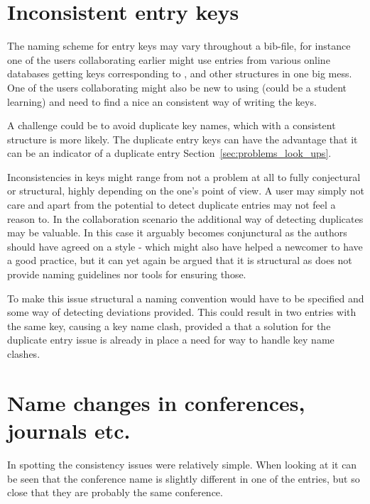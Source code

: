 \section{Inconsistent entry keys}
\label{sec:problems_inconsistent_keys}

The naming scheme for entry keys may vary throughout a bib-file, for
instance one of the users collaborating earlier might use entries from
various online databases getting keys corresponding to
,  and
other structures in one big mess.  One of the users collaborating
might also be new to using {\bibtex} (could be a student learning) and
need to find a nice an consistent way of writing the keys.

A challenge could be to avoid duplicate key names, which with a
consistent structure is more likely.  The duplicate entry keys can
have the advantage that it can be an indicator of a duplicate entry
Section~\ref{sec:problems_look_ups}.

Inconsistencies in keys might range from not a problem at all to fully
conjectural or structural, highly depending on the one's point of
view.  A user may simply not care and apart from the potential to
detect duplicate entries may not feel a reason to.  In the
collaboration scenario the additional way of detecting duplicates may
be valuable.  In this case it arguably becomes conjunctural as the
authors should have agreed on a style - which might also have helped a
newcomer to have a good practice, but it can yet again be argued that
it is structural as {\bibtex} does not provide naming guidelines nor
tools for ensuring those.

To make this issue structural a naming convention would have to be
specified and some way of detecting deviations provided.  This could
result in two entries with the same key, causing a key name clash,
provided a that a solution for the duplicate entry issue is already in
place a need for way to handle key name clashes.


\section{Name changes in conferences, journals etc.}
\label{sec:problems_name_changes}

In  spotting the consistency
issues were relatively simple.  When looking at
 it can be seen that the
conference name is slightly different in one of the entries, but so
close that they are probably the same conference.

